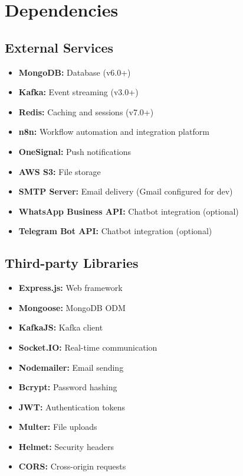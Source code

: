 \documentclass[11pt,a4paper]{article}
\begin{document}
\newpage

\section{Dependencies}

\subsection{External Services}

\begin{itemize}[leftmargin=*]
    \item \textbf{MongoDB:} Database (v6.0+)
    \item \textbf{Kafka:} Event streaming (v3.0+)
    \item \textbf{Redis:} Caching and sessions (v7.0+)
    \item \textbf{n8n:} Workflow automation and integration platform
    \item \textbf{OneSignal:} Push notifications
    \item \textbf{AWS S3:} File storage
    \item \textbf{SMTP Server:} Email delivery (Gmail configured for dev)
    \item \textbf{WhatsApp Business API:} Chatbot integration (optional)
    \item \textbf{Telegram Bot API:} Chatbot integration (optional)
\end{itemize}

\subsection{Third-party Libraries}

\begin{itemize}[leftmargin=*]
    \item \textbf{Express.js:} Web framework
    \item \textbf{Mongoose:} MongoDB ODM
    \item \textbf{KafkaJS:} Kafka client
    \item \textbf{Socket.IO:} Real-time communication
    \item \textbf{Nodemailer:} Email sending
    \item \textbf{Bcrypt:} Password hashing
    \item \textbf{JWT:} Authentication tokens
    \item \textbf{Multer:} File uploads
    \item \textbf{Helmet:} Security headers
    \item \textbf{CORS:} Cross-origin requests
\end{itemize}
\end{document}
